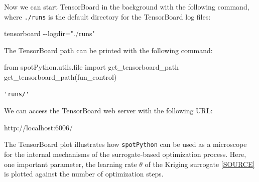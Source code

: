 \documentclass[
  letterpaper,
  DIV=11,
  numbers=noendperiod]{scrreprt}
\newenvironment{Shaded}{\begin{snugshade}}{\end{snugshade}}
\newcommand{\BuiltInTok}[1]{\textcolor[rgb]{0.00,0.23,0.31}{#1}}
\newcommand{\ImportTok}[1]{\textcolor[rgb]{0.00,0.46,0.62}{#1}}
\newcommand{\NormalTok}[1]{\textcolor[rgb]{0.00,0.23,0.31}{#1}}
\begin{document}
Now we can start TensorBoard in the background with the following
command, where \texttt{./runs} is the default directory for the
TensorBoard log files:

\begin{Shaded}
\begin{Highlighting}[]
\NormalTok{tensorboard {-}{-}logdir="./runs"}
\end{Highlighting}
\end{Shaded}

\begin{tcolorbox}[enhanced jigsaw, rightrule=.15mm, opacityback=0, colframe=quarto-callout-tip-color-frame, opacitybacktitle=0.6, toptitle=1mm, arc=.35mm, colbacktitle=quarto-callout-tip-color!10!white, coltitle=black, toprule=.15mm, leftrule=.75mm, titlerule=0mm, title=\textcolor{quarto-callout-tip-color}{\faLightbulb}\hspace{0.5em}{Tip: TENSORBOARD\_PATH}, bottomrule=.15mm, breakable, bottomtitle=1mm, left=2mm, colback=white]

The TensorBoard path can be printed with the following command:

\begin{Shaded}
\begin{Highlighting}[]
\ImportTok{from}\NormalTok{ spotPython.utils.}\BuiltInTok{file} \ImportTok{import}\NormalTok{ get\_tensorboard\_path}
\NormalTok{get\_tensorboard\_path(fun\_control)}
\end{Highlighting}
\end{Shaded}

\begin{verbatim}
'runs/'
\end{verbatim}

\end{tcolorbox}

We can access the TensorBoard web server with the following URL:

\begin{Shaded}
\begin{Highlighting}[]
\NormalTok{http://localhost:6006/}
\end{Highlighting}
\end{Shaded}

The TensorBoard plot illustrates how \texttt{spotPython} can be used as
a microscope for the internal mechanisms of the surrogate-based
optimization process. Here, one important parameter, the learning rate
\(\theta\) of the Kriging surrogate
\href{https://github.com/sequential-parameter-optimization/spotPython/blob/main/src/spotPython/build/kriging.py}{{[}SOURCE{]}}
is plotted against the number of optimization steps.
\end{document}
